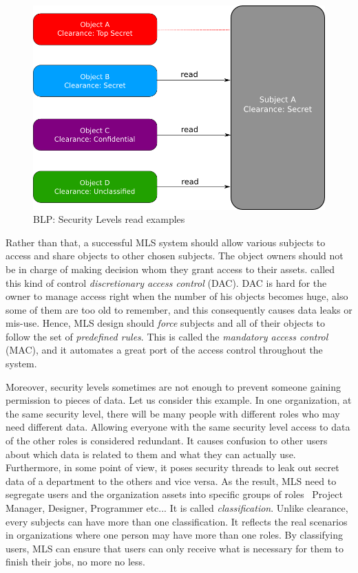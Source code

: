 \begin{figure}[bth]
\myfloatalign
\includegraphics[width=1.0\linewidth]{gfx/chapter_2/security_level_read_example}
\caption[BLP: Security Levels read examples]{BLP: Security Levels read examples}\label{fig:security_level_read_example}
\end{figure}

Rather than that, a successful MLS system should allow various subjects to access and share objects to other chosen subjects.
The object owners should not be in charge of making decision whom they grant access to their assets. 
\citeauthor{prasun:1996} \cite{prasun:1996} called this kind of control \emph{discretionary access control} (DAC).
DAC is hard for the owner to manage access right when the number of his objects becomes huge, also some of them are too old to remember, and this consequently causes data leaks or mis-use.
Hence, MLS design should \emph{force} subjects and all of their objects to follow the set of \emph{predefined rules}.
This is called the \emph{mandatory access control} (MAC), and it automates a great port of the access control throughout the system.

Moreover, security levels sometimes are not enough to prevent someone gaining permission to pieces of data.
Let us consider this example. 
In one organization, at the same security level, there will be many people with different roles who may need different data.
Allowing everyone with the same security level access to data of the other roles is considered redundant.
It causes confusion to other users about which data is related to them and what they can actually use.
Furthermore, in some point of view, it poses security threads to leak out secret data of a department to the others and vice versa.
As the result, MLS need to segregate users and the organization assets into specific groups of roles \eg\ Project Manager, Designer, Programmer etc...
It is called \emph{classification}.
Unlike clearance, every subjects can have more than one classification.
It reflects the real scenarios in organizations where one person may have more than one roles.
By classifying users, MLS can ensure that users can only receive what is necessary for them to finish their jobs, no more no less.

